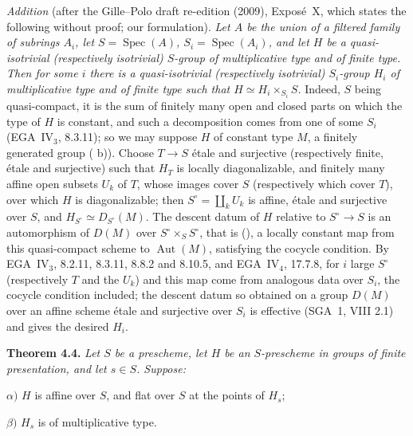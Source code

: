 \par\medskip\noindent
\emph{Addition} (after the Gille--Polo draft re-edition (2009), Expos\'e~X,
which states the following without proof; our formulation). \emph{Let \(A\)
be the union of a filtered family of subrings \(A_i\), let
\(S=\operatorname{Spec}(A)\), \(S_i=\operatorname{Spec}(A_i)\), and let \(H\)
be a quasi-isotrivial \textup{(}respectively isotrivial\textup{)}
\(S\)-group of multiplicative type and of finite type. Then for some \(i\)
there is a quasi-isotrivial \textup{(}respectively isotrivial\textup{)}
\(S_i\)-group \(H_i\) of multiplicative type and of finite type such that
\(H\simeq H_i\times_{S_i}S\).} Indeed, \(S\) being quasi-compact, it is the
sum of finitely many open and closed parts on which the type of \(H\) is
constant, and such a decomposition comes from one of some \(S_i\)
(EGA~IV\(_3\), 8.3.11); so we may suppose \(H\) of constant type \(M\), a
finitely generated group ( b)). Choose \(T\to S\) étale and
surjective (respectively finite, étale and surjective) such that \(H_T\) is
locally diagonalizable, and finitely many affine open subsets \(U_k\) of
\(T\), whose images cover \(S\) (respectively which cover \(T\)), over which
\(H\) is diagonalizable; then \(S^\circ=\coprod_kU_k\) is affine, étale and
surjective over \(S\), and \(H_{S^\circ}\simeq D_{S^\circ}(M)\). The descent
datum of \(H\) relative to \(S^\circ\to S\) is an automorphism of \(D(M)\)
over \(S^\circ\times_SS^\circ\), that is (), a locally constant map
from this quasi-compact scheme to \(\operatorname{Aut}(M)\), satisfying the
cocycle condition. By EGA~IV\(_3\), 8.2.11, 8.3.11, 8.8.2 and 8.10.5, and
EGA~IV\(_4\), 17.7.8, for \(i\) large \(S^\circ\) (respectively \(T\) and
the \(U_k\)) and this map come from analogous data over \(S_i\), the cocycle
condition included; the descent datum so obtained on a group \(D(M)\) over an
affine scheme étale and surjective over \(S_i\) is effective (SGA~1,
VIII 2.1) and gives the desired \(H_i\).

\par\medskip\noindent
\textbf{Theorem 4.4.}\enspace
\begingroup\itshape
Let \(S\) be a prescheme, let \(H\) be an \(S\)-prescheme in groups of
finite presentation, and let \(s\in S\). Suppose:

\smallskip
\noindent
\(\alpha)\) \(H\) is affine over \(S\), and flat over \(S\) at the points of
\(H_s\);

\smallskip
\noindent
\(\beta)\) \(H_s\) is of multiplicative type.

